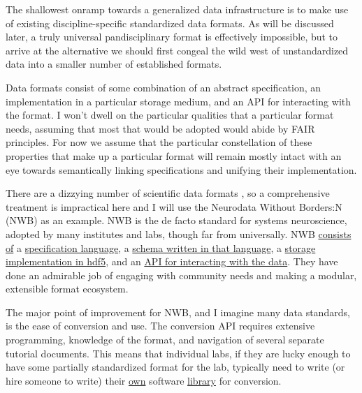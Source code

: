 \documentclass[10pt]{article}
\begin{document}
\begin{multicols}{2}
 The shallowest onramp towards a generalized data
infrastructure is to make use of existing discipline-specific
standardized data formats. As will be discussed later, a truly universal
pandisciplinary format is effectively impossible, but to arrive at the
alternative we should first congeal the wild west of unstandardized data
into a smaller number of established formats.

Data formats consist of some combination of an abstract specification,
an implementation in a particular storage medium, and an API for
interacting with the format. I won't dwell on the particular qualities
that a particular format needs, assuming that most that would be adopted
would abide by FAIR principles. For now we assume that the particular
constellation of these properties that make up a particular format will
remain mostly intact with an eye towards semantically linking
specifications and unifying their implementation.

There are a dizzying number of scientific data formats \cite{teamScientificDataFormats} , so a comprehensive treatment is
impractical here and I will use the Neurodata Without Borders:N
(NWB)\cite{rubelNWBAccessibleData2019a}  as an example. NWB is
the de facto standard for systems neuroscience, adopted by many
institutes and labs, though far from universally. NWB
\href{https://www.nwb.org/nwb-software/}{consists of} a
\href{https://schema-language.readthedocs.io/en/stable/}{specification
language}, a \href{https://nwb-schema.readthedocs.io/en/stable/}{schema
written in that language}, a
\href{https://nwb-storage.readthedocs.io/en/stable/}{storage
implementation in hdf5}, and an
\href{https://pynwb.readthedocs.io/en/stable/}{API for interacting with
the data}. They have done an admirable job of engaging with community
needs \cite{rubelNeurodataBordersEcosystem2021}  and making a
modular, extensible format ecosystem.

The major point of improvement for NWB, and I imagine many data
standards, is the ease of conversion and use. The conversion API
requires extensive programming, knowledge of the format, and navigation
of several separate tutorial documents. This means that individual labs,
if they are lucky enough to have some partially standardized format for
the lab, typically need to write (or hire someone to write) their
\href{https://github.com/catalystneuro/tank-lab-to-nwb}{own} software
\href{https://github.com/catalystneuro/mease-lab-to-nwb}{library} for
conversion.


\end{multicols}
\end{document}
